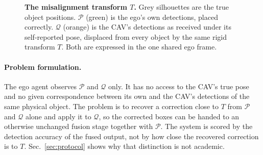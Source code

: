 \begin{figure}[t]
  \centering
  \resizebox{\linewidth}{!}{}
  \caption{\textbf{The misalignment transform $T$.} Grey silhouettes are the true object positions. $\mathcal{P}$ (green) is the ego's own detections, placed correctly. $\mathcal{Q}$ (orange) is the CAV's detections as received under its self-reported pose, displaced from every object by the same rigid transform $T$. Both are expressed in the one shared ego frame.}
  \label{fig:misalignment}
\end{figure}

\paragraph{Problem formulation.}
The ego agent observes $\mathcal{P}$ and $\mathcal{Q}$ only. It has no access to the CAV's true pose and no given correspondence between its own and the CAV's detections of the same physical object. The problem is to recover a correction close to $T$ from $\mathcal{P}$ and $\mathcal{Q}$ alone and apply it to $\mathcal{Q}$, so the corrected boxes can be handed to an otherwise unchanged fusion stage together with $\mathcal{P}$. The system is scored by the detection accuracy of the fused output, not by how close the recovered correction is to $T$. Sec.~\ref{sec:protocol} shows why that distinction is not academic.
